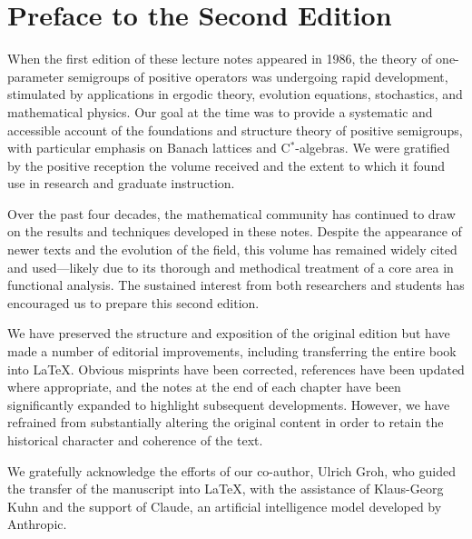 %

\preface

\section*{Preface to the Second Edition}
	
	When the first edition of these lecture notes appeared in 1986, the theory of one-parameter semigroups of positive operators was undergoing rapid development, stimulated by applications in ergodic theory, evolution equations, stochastics, and mathematical physics. 
	Our goal at the time was to provide a systematic and accessible account of the foundations and structure theory of positive semigroups, with particular emphasis on Banach lattices and C$^*$-algebras.
	We were gratified by the positive reception the volume received and the extent to which it found use in research and graduate instruction.
	
	Over the past four decades, the mathematical community has continued to draw on the results and techniques developed in these notes. 
	Despite the appearance of newer texts and the evolution of the field, this volume has remained widely cited and used—likely due to its thorough and methodical treatment of a core area in functional analysis. 
	The sustained interest from both researchers and students has encouraged us to prepare this second edition.
	
	We have preserved the structure and exposition of the original edition but have made a number of editorial improvements, including transferring the entire book into \LaTeX{}. 
	Obvious misprints have been corrected, references have been updated where appropriate, and the notes at the end of each chapter have been significantly expanded to highlight subsequent developments. 
	However, we have refrained from substantially altering the original content in order to retain the historical character and coherence of the text.
	
	We gratefully acknowledge the efforts of our co-author, Ulrich Groh, who guided the transfer of the manuscript into \LaTeX{}, with the assistance of Klaus-Georg Kuhn and the support of Claude, an artificial intelligence model developed by Anthropic.
	
